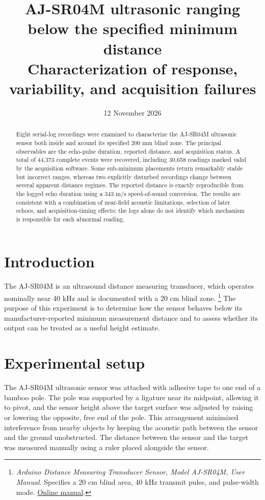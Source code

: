 \documentclass[11pt,a4paper]{article}
\date{12 November 2026}
\title{AJ-SR04M ultrasonic ranging below the specified minimum distance\\\medskip
\large Characterization of response, variability, and acquisition failures}
\begin{document}
\maketitle
\tableofcontents

\begin{abstract}
Eight serial-log recordings were examined to characterize the AJ-SR04M ultrasonic sensor both inside and around its specified 200 mm blind zone. The principal observables are the echo-pulse duration, reported distance, and acquisition status. A total of 44,373 complete events were recovered, including 30,658 readings marked valid by the acquisition software.  Some sub-minimum placements return remarkably stable but incorrect ranges, whereas two explicitly disturbed recordings change between several apparent distance regimes. The reported distance is exactly reproducible from the logged echo duration using a 343 m/s speed-of-sound conversion. The results are consistent with a combination of near-field acoustic limitations, selection of later echoes, and acquisition-timing effects; the logs alone do not identify which mechanism is responsible for each abnormal reading.
\end{abstract}
\section{Introduction}
\label{sec:org6872284}
The AJ-SR04M is an ultrasound distance measuring transducer, which operates nominally near 40 kHz and is documented with a 20 cm blind zone. \footnote{\emph{Arduino Distance Measuring Transducer Sensor, Model AJ-SR04M,
User Manual}. Specifies a 20 cm blind area, 40 kHz transmit pulse, and
pulse-width mode. \href{https://manuals.plus/m/4f3549b5e4ee5c38ece4f1568cabf9447d5f667b07a22233d50c6c45a6bbcbf0}{Online manual}.\label{orga5a5be2}} The purpose of this experiment is to determine how the sensor behaves below its manufacturer-reported minimum measurement distance and to assess whether its output can be treated as a useful height estimate.
\section{Experimental setup}
\label{sec:org1198f9d}
The AJ-SR04M ultrasonic sensor was attached with adhesive tape to one end of a bamboo pole. The pole was supported by a ligature near its midpoint, allowing it to pivot, and the sensor height above the target surface was adjusted by raising or lowering the opposite, free end of the pole. This arrangement minimized interference from nearby objects by keeping the acoustic path between the sensor and the ground unobstructed. The distance between the sensor and the target was measured manually using a ruler placed alongside the sensor.
\end{document}
